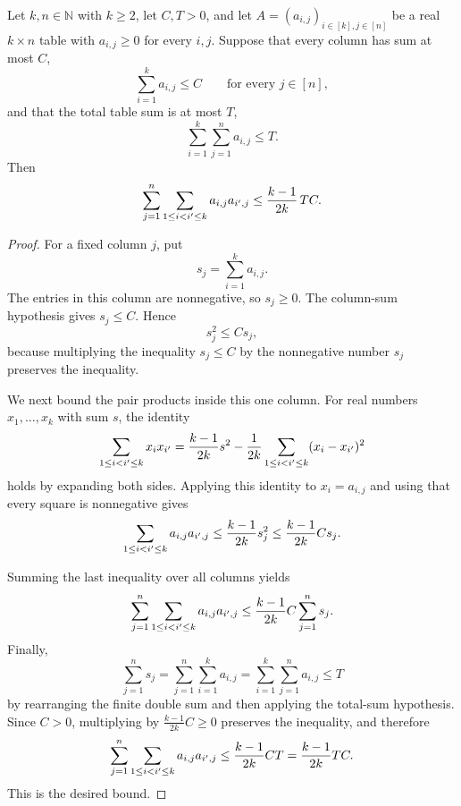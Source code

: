 \begin{lemma}
Let $k,n\in\mathbb N$ with $k\ge2$, let $C,T>0$, and let
$A=(a_{i,j})_{i\in[k],j\in[n]}$ be a real $k\times n$ table with
$a_{i,j}\ge0$ for every $i,j$.  Suppose that every column has sum at most
$C$,
\[
\sum_{i=1}^k a_{i,j}\le C\qquad\text{for every }j\in[n],
\]
and that the total table sum is at most $T$,
\[
\sum_{i=1}^k\sum_{j=1}^n a_{i,j}\le T.
\]
Then
\[
\sum_{j=1}^{n}\sum_{1\le i<i'\le k}a_{i,j}a_{i',j}
\le {k-1\over 2k}\,TC .
\]
\end{lemma}
\begin{proof}
For a fixed column $j$, put
\[
s_j=\sum_{i=1}^k a_{i,j}.
\]
The entries in this column are nonnegative, so $s_j\ge0$.  The column-sum
hypothesis gives $s_j\le C$.  Hence
\[
s_j^2\le Cs_j,
\]
because multiplying the inequality $s_j\le C$ by the nonnegative number
$s_j$ preserves the inequality.

We next bound the pair products inside this one column.  For real numbers
$x_1,\ldots,x_k$ with sum $s$, the identity
\[
\sum_{1\le i<i'\le k}x_ix_{i'}
= {k-1\over 2k}s^2
- {1\over 2k}\sum_{1\le i<i'\le k}(x_i-x_{i'})^2
\]
holds by expanding both sides.  Applying this identity to
$x_i=a_{i,j}$ and using that every square is nonnegative gives
\[
\sum_{1\le i<i'\le k}a_{i,j}a_{i',j}
\le {k-1\over 2k}s_j^2
\le {k-1\over 2k}Cs_j .
\]

Summing the last inequality over all columns yields
\[
\sum_{j=1}^{n}\sum_{1\le i<i'\le k}a_{i,j}a_{i',j}
\le {k-1\over 2k}C\sum_{j=1}^n s_j.
\]
Finally,
\[
\sum_{j=1}^n s_j
=\sum_{j=1}^n\sum_{i=1}^k a_{i,j}
=\sum_{i=1}^k\sum_{j=1}^n a_{i,j}
\le T
\]
by rearranging the finite double sum and then applying the total-sum
hypothesis.  Since $C>0$, multiplying by
$\frac{k-1}{2k}C\ge0$ preserves the inequality, and therefore
\[
\sum_{j=1}^{n}\sum_{1\le i<i'\le k}a_{i,j}a_{i',j}
\le {k-1\over 2k}CT
={k-1\over 2k}TC .
\]
This is the desired bound.
\end{proof}
